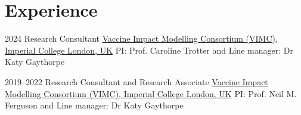 \documentclass[ letterpaper]{twentysecondcv} %
\begin{document}
\section{Experience}

\begin{twenty} %

 \twentyitem
    	{2024}
		{}
        {Research Consultant}
	{\href{https://www.vaccineimpact.org/}{Vaccine Impact Modelling Consortium (VIMC), Imperial College London, UK}{ PI: Prof. Caroline Trotter  and Line manager: Dr Katy Gaythorpe}}
         {}
  
 \twentyitem
    	{2019--2022}
		{}
        {Research Consultant and Research Associate}
        {\href{https://www.vaccineimpact.org/}{Vaccine Impact Modelling Consortium (VIMC), Imperial College London, UK}{ PI: Prof. Neil M. Ferguson and Line manager: Dr Katy Gaythorpe}}
         {}
  


\end{twenty}
\end{document}

